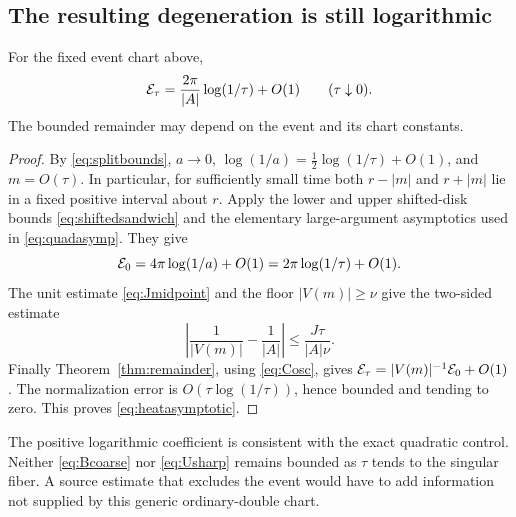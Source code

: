 \subsection{The resulting degeneration is still logarithmic}
\begin{corollary}\label{cor:heatasymptotic}
For the fixed event chart above,
\begin{equation}\label{eq:heatasymptotic}
 \mathcal E_\tau=\frac{2\pi}{|A|}\log(1/\tau)+O(1)
                                    \qquad(\tau\downarrow0).
\end{equation}
The bounded remainder may depend on the event and its chart constants.
\end{corollary}
\begin{proof}
By \eqref{eq:splitbounds}, $a\longrightarrow0$,
$\log(1/a)=\tfrac12\log(1/\tau)+O(1)$, and $m=O(\tau)$.
In particular, for sufficiently small time both $r-|m|$ and $r+|m|$
lie in a fixed positive interval about $r$. Apply the lower and upper
shifted-disk bounds \eqref{eq:shiftedsandwich} and the elementary
large-argument asymptotics used in \eqref{eq:quadasymp}. They give
\[
 \mathcal E_0=4\pi\log(1/a)+O(1)
      =2\pi\log(1/\tau)+O(1).
\]
The unit estimate \eqref{eq:Jmidpoint} and the floor $|V(m)|\geq\nu$
give the two-sided estimate
\[
 \left|\frac1{|V(m)|}-\frac1{|A|}\right|
                       \leq\frac{J\tau}{|A|\nu}.
\]
Finally Theorem~\ref{thm:remainder}, using \eqref{eq:Cosc}, gives
$\mathcal E_\tau=|V(m)|^{-1}\mathcal E_0+O(1)$. The normalization error is
$O(\tau\log(1/\tau))$, hence bounded and tending to zero. This proves
\eqref{eq:heatasymptotic}.
\end{proof}

The positive logarithmic coefficient is consistent with the exact
quadratic control. Neither \eqref{eq:Bcoarse} nor \eqref{eq:Usharp}
remains bounded as $\tau$ tends to the singular fiber. A source estimate
that excludes the event would have to add information not supplied by
this generic ordinary-double chart.
